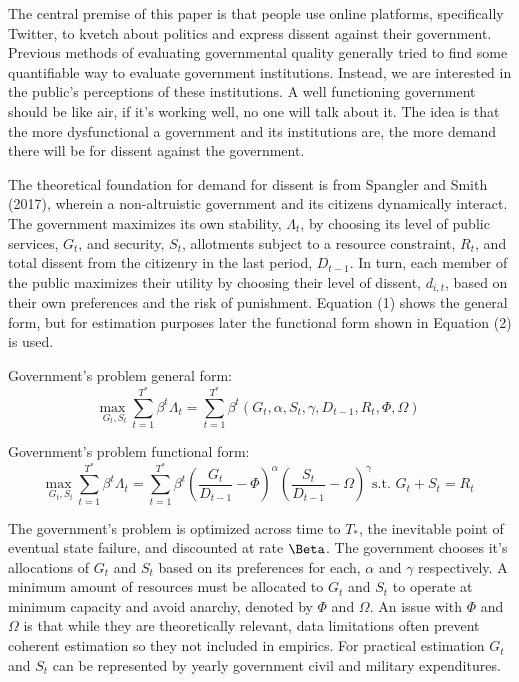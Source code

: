 \documentclass[12pt]{article}
\begin{document}
\begin{spacing}{1.5}
The central premise of this paper is that people use online platforms, specifically Twitter, to kvetch about politics and express dissent against their government. Previous methods of evaluating governmental quality generally tried to find some quantifiable way to evaluate government institutions. Instead, we are interested in the public's perceptions of these institutions. A well functioning government should be like air, if it's working well, no one will talk about it. The idea is that the more dysfunctional a government and its institutions are, the more demand there will be for dissent against the government.

The theoretical foundation for demand for dissent is from Spangler and Smith (2017), wherein a non-altruistic government and its citizens dynamically interact. The government maximizes its own stability, $\Lambda_t$, by choosing its level of public services, $G_t$, and security, $S_t$, allotments subject to a resource constraint, $R_t$, and total dissent from the citizenry in the last period, $D_{t-1}$. In turn, each member of the public maximizes their utility by choosing their level of dissent, $d_{i,t}$, based on their own preferences and the risk of punishment. Equation (1) shows the general form, but for estimation purposes later the functional form shown in Equation (2) is used.   

\vspace{.5 em}

\noindent Government's problem general form:
\begin{equation}
{\underset{G_t,S_t}{\text{max }}} \sum\limits_{t=1}^{T^*} \beta^t {\Lambda}_t = \sum\limits_{t=1}^{T^*} \beta^t\left(G_t,\alpha, S_t,\gamma ,D_{t-1},R_t,\Phi,\Omega \right)   
\end{equation}

\vspace{.5 em}

\noindent Government's problem functional form:
\begin{equation}
{\underset{G_t,S_t}{\text{max }}} \sum\limits_{t=1}^{T^*} \beta^t {\Lambda}_t = \sum\limits_{t=1}^{T^*} \beta^t\left(\frac{G_t}{D_{t-1}}-\Phi\right)^\alpha \left(\frac{S_t}{D_{t-1}}-\Omega\right)^\gamma   \text{s.t. } G_t+S_t=R_t
\end{equation}


The government's problem is optimized across time to $T_*$, the inevitable point of eventual state failure, and discounted at rate $\Beta$. The government chooses it's allocations of $G_t$ and $S_t$ based on its preferences for each, $\alpha$ and $\gamma$ respectively. A minimum amount of resources must be allocated to $G_t$ and $S_t$ to operate at minimum capacity and avoid anarchy, denoted by $\Phi$ and $\Omega$. An issue with $\Phi$ and $\Omega$ is that while they are theoretically relevant, data limitations often prevent coherent estimation so they not included in empirics. For practical estimation $G_t$ and $S_t$ can be represented by yearly government civil and military expenditures.  


\end{spacing}
\end{document}
